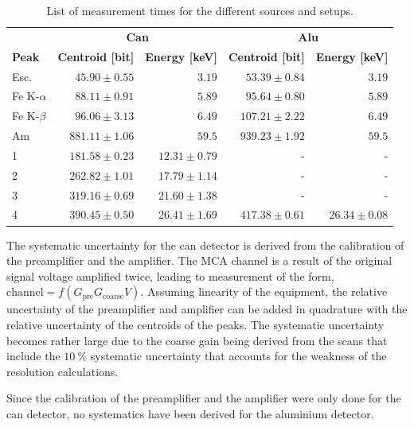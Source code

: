 \begin{table}[htbp]
  \centering
\begin{tabular}{lrrrr}
              & \multicolumn{2}{c}{\textbf{Can}} & \multicolumn{2}{c}{\textbf{Alu}} \\
\textbf{Peak} & \textbf{Centroid [bit]}      & \textbf{Energy [keV]}      & \textbf{Centroid [bit]}     & \textbf{Energy [keV]}     \\ \hline
Esc.          & $ 45.90 \pm 0.55$ & $ 3.19$          & $ 53.39 \pm 0.84$ & $ 3.19$          \\
Fe K-$\alpha$ & $ 88.11 \pm 0.91$ & $ 5.89$          & $ 95.64 \pm 0.80$ & $ 5.89$          \\
Fe K-$\beta$  & $ 96.06 \pm 3.13$ & $ 6.49$          & $107.21 \pm 2.22$ & $ 6.49$          \\
Am            & $881.11 \pm 1.06$ & $ 59.5$          & $939.23 \pm 1.92$ & $ 59.5$          \\
1             & $181.58 \pm 0.23$ & $12.31 \pm 0.79$ & -                 & -                \\
2             & $262.82 \pm 1.01$ & $17.79 \pm 1.14$ & -                 & -                \\
3             & $319.16 \pm 0.69$ & $21.60 \pm 1.38$ & -                 & -                \\
4             & $390.45 \pm 0.50$ & $26.41 \pm 1.69$ & $417.38 \pm 0.61$ & $26.34 \pm 0.08$ \\ \hline
\end{tabular}
\caption{List of measurement times for the different sources and setups.}
\label{tab:peakschannelenergies}
\end{table}

The systematic uncertainty for the can detector is derived from the calibration of the preamplifier and the amplifier.
The MCA channel is a result of the original signal voltage amplified twice, leading to measurement of the form, $\textrm{channel} = f(G_\mathrm{pre} G_\mathrm{coarse} V)$.
Assuming linearity of the equipment, the relative uncertainty of the preamplifier and amplifier can be added in quadrature with the relative uncertainty of the centroids of the peaks.
The systematic uncertainty becomes rather large due to the coarse gain being derived from the scans that include the $\SI{10}{\percent}$ systematic uncertainty that accounts for the weakness of the resolution calculations.

Since the calibration of the preamplifier and the amplifier were only done for the can detector, no systematics have been derived for the aluminium detector.

